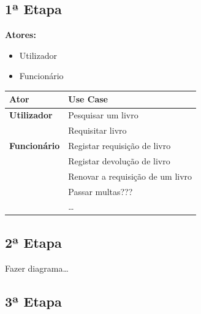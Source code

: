 \documentclass[11pt]{article}
\begin{document}
\subsection{1ª Etapa}
\label{sec:orgeb31b87}
\textbf{Atores:}
\begin{itemize}
\item Utilizador
\item Funcionário
\end{itemize}

\begin{center}
\begin{tabular}{ll}
\hline
\textbf{Ator} & \textbf{Use Case}\\
\hline
\textbf{Utilizador} & Pesquisar um livro\\
 & Requisitar livro\\
\hline
\textbf{Funcionário} & Registar requisição de livro\\
 & Registar devolução de livro\\
 & Renovar a requisição de um livro\\
 & Passar multas???\\
 & \ldots{}\\
\hline
\end{tabular}
\end{center}

\subsection{2ª Etapa}
\label{sec:orgd3df0e6}
Fazer diagrama\ldots{}
\subsection{3ª Etapa}
\label{sec:org8982499}
\end{document}
